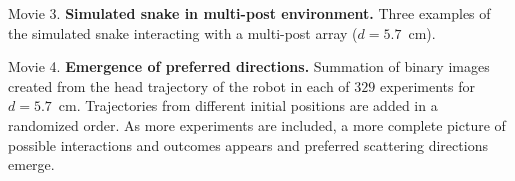 \documentclass[aps,pre,twocolumn,superscriptaddress]{revtex4-1}
\begin{document}
Movie 3. \textbf{Simulated snake in multi-post environment.} Three examples of the simulated snake interacting with a multi-post array ($d = 5.7$~cm).
\label{mov:multiPostSim}
\vspace{5mm}

Movie 4. \textbf{Emergence of preferred directions.} Summation of binary images created from the head trajectory of the robot in each of $329$ experiments for $d = 5.7$~cm.  Trajectories from different initial positions are added in a randomized order. As more experiments are included, a more complete picture of possible interactions and outcomes appears and preferred scattering directions emerge.
\label{mov:preferredDirections}	
\end{document}

